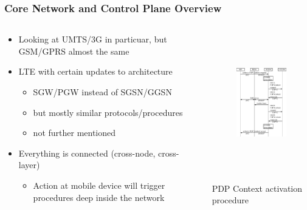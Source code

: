 \documentclass{beamer}
\begin{document}
\begin{frame}
	\frametitle{Core Network and Control Plane Overview}


    \begin{columns}[T]
    	\begin{column}[T]{5cm}
			\begin{itemize}
				\item Looking at UMTS/3G in particuar, but GSM/GPRS almost the same
				\item LTE with certain updates to architecture
					\begin{itemize}
						\item SGW/PGW instead of SGSN/GGSN
						\item but mostly similar protocols/procedures
						\item not further mentioned
					\end{itemize}

				\item Everything is connected (cross-node, cross-layer)
					\begin{itemize}
						\item Action at mobile device will trigger procedures deep inside the network
					\end{itemize}

			\end{itemize}
		\end{column}

    	\begin{column}[T]{5cm}
			\begin{figure}
				\centering
				\includegraphics[height=6cm]{../../chapters/04-mobilenets/images/pdp-context-activation-procedure.pdf}
			\end{figure}
			\vspace{-0.5cm}
			{\small PDP Context activation procedure}
		\end{column}
	\end{columns}
\end{frame}
\end{document}

